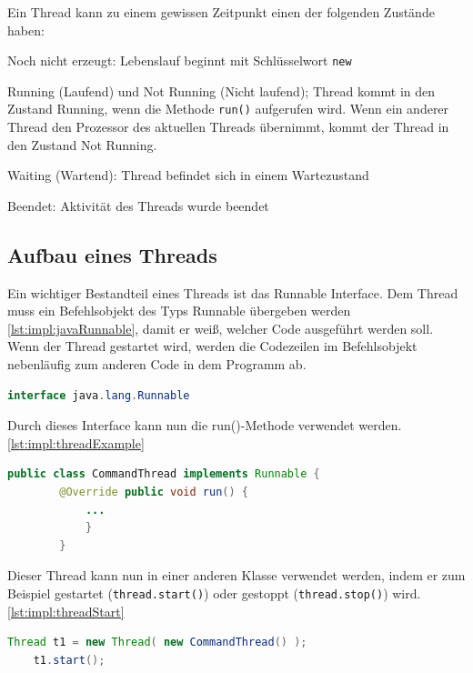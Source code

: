 Ein Thread kann zu einem gewissen Zeitpunkt einen der folgenden Zustände haben:
\begin{compactitem}
    \item Noch nicht erzeugt: Lebenslauf beginnt mit Schlüsselwort \texttt{new}
    \item Running (Laufend) und Not Running (Nicht laufend); Thread kommt in den Zustand Running, wenn die Methode \texttt{run()} aufgerufen wird. Wenn ein anderer Thread den Prozessor des aktuellen Threads übernimmt, kommt der Thread in den Zustand Not Running.    
    \item Waiting (Wartend): Thread befindet sich in einem Wartezustand
    \item Beendet: Aktivität des Threads wurde beendet
\end{compactitem}
\cite{javaInselBuch} 

\subsection{Aufbau eines Threads}
Ein wichtiger Bestandteil eines Threads ist das Runnable Interface. 
Dem Thread muss ein Befehlsobjekt des Typs Runnable übergeben werden \ref{lst:impl:javaRunnable}, damit er weiß, welcher Code ausgeführt werden soll.
Wenn der Thread gestartet wird, werden die Codezeilen im Befehlsobjekt nebenläufig zum anderen Code in dem Programm ab. \cite{javaInselBuch}
 


\begin{lstlisting}[language=java,caption=Java Runnable,label=lst:impl:javaRunnable]
    interface java.lang.Runnable
\end{lstlisting}
 
Durch dieses Interface kann nun die run()-Methode verwendet werden. \ref{lst:impl:threadExample}
 
\begin{lstlisting}[language=java,caption=Einfaches Thread Beispiel,label=lst:impl:threadExample]
    public class CommandThread implements Runnable { 
        @Override public void run() {   
            ...
            }
        }
\end{lstlisting}
 
Dieser Thread kann nun in einer anderen Klasse verwendet werden, indem er zum Beispiel gestartet (\texttt{thread.start()}) oder gestoppt (\texttt{thread.stop()}) wird. \ref{lst:impl:threadStart}
 
\begin{lstlisting}[language=java,caption=Thread erstellen/starten,label=lst:impl:threadStart]
    Thread t1 = new Thread( new CommandThread() );
    t1.start();
\end{lstlisting}
 
